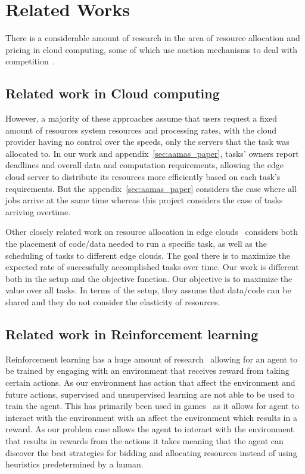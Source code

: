 \documentclass[sotoncolour]{uosproject}     %
\begin{document}
\chapter{Related Works}\label{ch:related-works}
There is a considerable amount of research in the area of resource allocation and pricing in cloud computing, some of
which use auction mechanisms to deal with competition~\cite{KUMAR2017234,Zhang2017,Du2019,Bi2019}.

\section{Related work in Cloud computing}\label{sec:related-work-cloud-computing}
However, a majority of these approaches assume that users request a fixed amount of resources system resources and
processing rates, with the cloud provider having no control over the speeds, only the servers that the task was
allocated to.  In our work and appendix~\ref{sec:aamas_paper}, tasks' owners report deadlines and overall data and
computation requirements, allowing the edge cloud server to distribute its resources more efficiently based on each
task's requirements. But the appendix~\ref{sec:aamas_paper} considers the case where all jobs arrive at the same
time whereas this project considers the case of tasks arriving overtime.

Other closely related work on resource allocation in edge clouds~\cite{vaji_infocom} considers both the placement of
code/data needed to run a specific task, as well as the scheduling of tasks to different edge clouds. The goal there
is to maximize the expected rate of successfully accomplished tasks over time. Our work is different both in the setup
and the objective function. Our objective is to maximize the value over all tasks. In terms of the setup, they assume
that data/code can be shared and they do not consider the elasticity of resources.

\section{Related work in Reinforcement learning}\label{sec:related-work-reinforcement-learning}
Reinforcement learning has a huge amount of research~\cite{Sutton1998} allowing for an agent to be trained by engaging
with an environment that receives reward from taking certain actions. As our environment has action that affect the
environment and future actions, supervised and unsupervised learning are not able to be used to train the agent.
This has primarily been used in games~\cite{atari, silver2017mastering} as it allows for agent to interact with the
environment with an affect the environment which results in a reward. As our problem case allows the agent to interact
with the environment that results in rewards from the actions it takes meaning that the agent can discover the best
strategies for bidding and allocating resources instead of using heuristics predetermined by a human.
\end{document}
